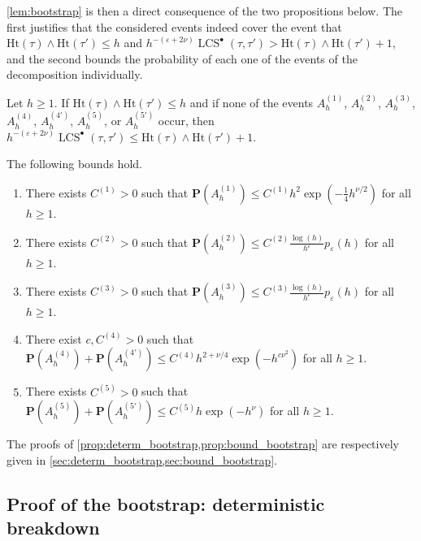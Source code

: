 \documentclass[11pt,reqno]{amsart}
\newcommand{\1}{\mathbf{1}}
\newcommand{\0}{\mathbf{0}}
\newcommand{\prob}{\mathbf{P}}
\newcommand{\Ht}{\mathrm{Ht}}
\newcommand{\LCS}{\operatorname{LCS}}
\newcommand{\eps}{\varepsilon}
\begin{document}
\cref{lem:bootstrap} is then a direct consequence of the two propositions below. The first justifies that the considered events indeed cover the event that $\Ht(\tau)\wedge\Ht(\tau')\leq h$ and $h^{-(\eps+2\nu)}\LCS^\bullet(\tau,\tau')> \Ht(\tau)\wedge\Ht(\tau')+1$, and the second bounds the probability of each one of the events of the decomposition individually.

\begin{prop}
\label{prop:determ_bootstrap}
    Let $h\geq 1$. If $\Ht(\tau)\wedge \Ht(\tau')\leq h$ and if none of the events $A_h^{(1)}$, $A_h^{(2)}$, $A_h^{(3)}$, $A_h^{(4)}$, $A_h^{(4')}$, $A_h^{(5)}$, or $A_h^{(5')}$ occur, then $h^{-(\eps+2\nu)}\LCS^\bullet(\tau,\tau')\leq  \Ht(\tau)\wedge\Ht(\tau')+1$. 
\end{prop}

\begin{prop}
\label{prop:bound_bootstrap}
    The following bounds hold.
    \begin{enumerate}
        \item[\emph{(1)}] There exists $C^{(1)} > 0$ such that $\prob(A_h^{(1)}) \leq C^{(1)}h^2\exp(-\tfrac{1}{4}h^{\nu/2})$ for all $h \geq 1$.    
        \item[\emph{(2)}] There exists $C^{(2)} > 0$ such that $\prob(A_h^{(2)}) \leq C^{(2)}\frac{\log(h)}{h^{\varepsilon}}p_\varepsilon(h)$ for all $h \geq 1$.
        \item[\emph{(3)}] There exists $C^{(3)} > 0$ such that $\prob(A_h^{(3)}) \leq C^{(3)}\frac{\log(h)}{h^\varepsilon}p_\varepsilon(h)$ for all $h \geq 1$.
        \item[\emph{(4)}] There exist $c,C^{(4)} > 0$ such that $\prob(A_{h}^{(4)})+\prob(A_h^{(4')}) \leq C^{(4)}h^{2+\nu/4}\exp(-h^{c\nu^2})$ for all $h \geq 1$.
        \item[\emph{(5)}] There exists $C^{(5)} > 0$ such that $\prob(A_h^{(5)})+\prob(A_h^{(5')}) \leq C^{(5)}h\exp(-h^{\nu})$ for all $h \geq 1$.    
    \end{enumerate}
\end{prop}

The proofs of \cref{prop:determ_bootstrap,prop:bound_bootstrap} are respectively given in \cref{sec:determ_bootstrap,sec:bound_bootstrap}.


\subsection{Proof of the bootstrap: deterministic breakdown}
\label{sec:determ_bootstrap}
\end{document}

